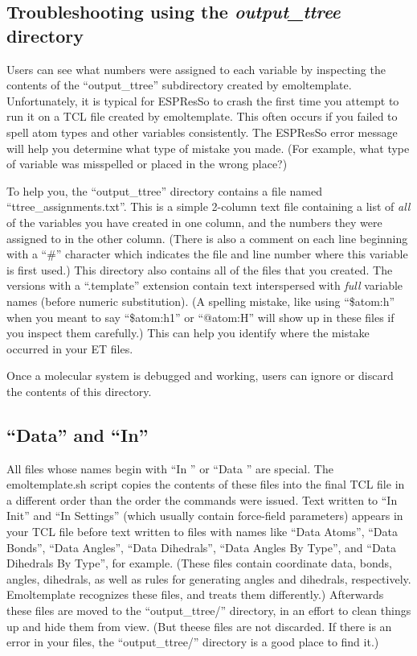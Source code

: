 \documentclass[11pt]{article}
\begin{document}
\subsection{Troubleshooting using the \textit{output\_ttree} directory}
\label{sec:output_ttree}
Users can see what numbers were assigned to each variable 
by inspecting the contents of the ``output\_ttree'' subdirectory
created by emoltemplate. 
Unfortunately, it is typical for ESPResSo to crash the first time you 
attempt to run it on a TCL file created by emoltemplate.  This often occurs 
if you failed to spell atom types and other variables consistently.
The ESPResSo error message 
will help you determine what type of mistake you made.
(For example, what type of variable was misspelled or placed in the wrong place?)

To help you, the ``output\_ttree'' directory contains a file named 
``ttree\_assignments.txt''. 
This is a simple 2-column text file containing a list of \textit{all} 
of the variables you have created in one column, and the numbers they
were assigned to in the other column.
(There is also a comment on each line beginning with a ``\#'' character which
indicates the file and line number where this variable is first used.)
This directory also contains all of the files that you created. 
The versions with a ``.template'' extension contain text
interspersed with \textit{full} variable names (before numeric substitution).
(A spelling mistake, like using ``\$atom:h'' when you meant to say ``\$atom:h1''
or ``@atom:H'' will show up in these files if you inspect them carefully.)
This can help you identify where the mistake occurred
in your ET files.

Once a molecular system is debugged and working, users 
can ignore or discard the contents of this directory.


\subsection{``Data'' and ``In''}
\label{sec:DataIn}

All files whose names begin with ``In '' or ``Data '' are special.
The emoltemplate.sh script copies the contents 
of these files into the final TCL file in a different order than the
order the commands were issued.
Text written to ``In Init'' and ``In Settings''
(which usually contain force-field parameters)
appears in your TCL file before text written to files with names like
``Data Atoms'', ``Data Bonds'', ``Data Angles'',
``Data Dihedrals'', 
``Data Angles By Type'', and
``Data Dihedrals By Type'',
for example.
(These files contain coordinate data, bonds, angles, dihedrals,
as well as rules for generating angles and dihedrals, respectively.
Emoltemplate recognizes these files, and treats them differently.)
Afterwards these files are moved to the ``output\_ttree/'' directory, 
in an effort to clean things up and hide them from view.
(But theese files are not discarded.  If there is an error in your files,
the ``output\_ttree/'' directory is a good place to find it.)
\end{document}

